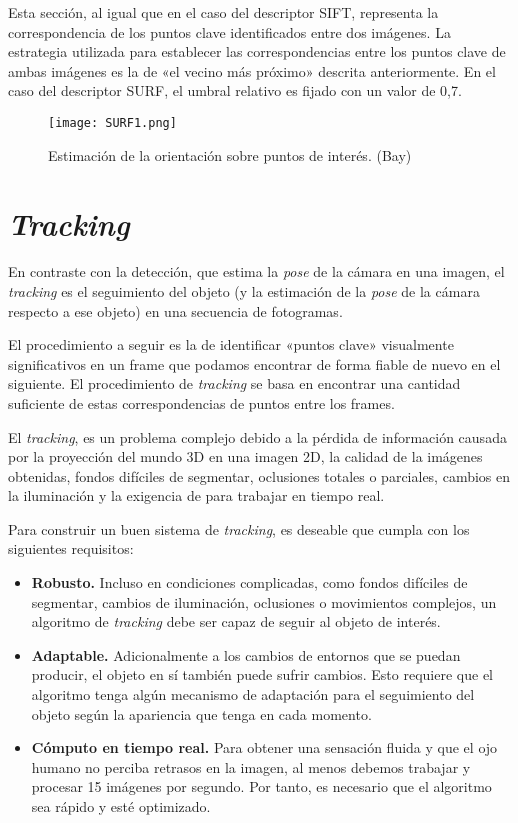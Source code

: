 Esta sección, al igual que en el caso del descriptor SIFT, representa la correspondencia de los puntos clave identificados entre dos imágenes. La estrategia utilizada para establecer las correspondencias entre los puntos clave de ambas imágenes es la de «el vecino más próximo» descrita anteriormente. En el caso del descriptor SURF, el umbral relativo es fijado con un valor de 0,7.

\begin{figure}[t]
  \centering        
  \texttt{[image: SURF1.png]}
  \caption{Estimación de la orientación sobre puntos de interés. (Bay)}
  \label{fig:SURF1}
\end{figure}

\section{\textit{Tracking}}
En contraste con la detección, que estima la \textit{pose} de la cámara en una imagen, el \textit{tracking} es el seguimiento del objeto (y la estimación de la \textit{pose} de la cámara respecto a ese objeto) en una secuencia de fotogramas.

El procedimiento a seguir es la de identificar «puntos clave» visualmente significativos en un frame que podamos encontrar de forma fiable de nuevo en el siguiente. El procedimiento de \textit{tracking} se basa en encontrar una cantidad suficiente de estas correspondencias de puntos entre los frames.

El \textit{tracking}, es un problema complejo debido a la pérdida de información causada por la proyección del mundo 3D en una imagen 2D, la calidad de la imágenes obtenidas, fondos difíciles de segmentar, oclusiones totales o parciales, cambios en la iluminación y la exigencia de para trabajar en tiempo real. 

Para construir un buen sistema de \textit{tracking}, es deseable que cumpla con los siguientes requisitos:

\begin{itemize}
\item\textbf{Robusto.} Incluso en condiciones complicadas, como fondos difíciles de segmentar, cambios de iluminación, oclusiones o movimientos complejos, un algoritmo de \textit{tracking} debe ser capaz de seguir al objeto de interés.

\item\textbf{Adaptable.} Adicionalmente a los cambios de entornos que se puedan producir, el objeto en sí también puede sufrir cambios. Esto requiere que el algoritmo tenga algún mecanismo de adaptación para el seguimiento del objeto según la apariencia que tenga en cada momento.

\item\textbf{Cómputo en tiempo real.} Para obtener una sensación fluida y que el ojo humano no perciba retrasos en la imagen, al menos debemos trabajar y procesar 15 imágenes por segundo. Por tanto, es necesario que el algoritmo sea rápido y esté optimizado.

\end{itemize}

